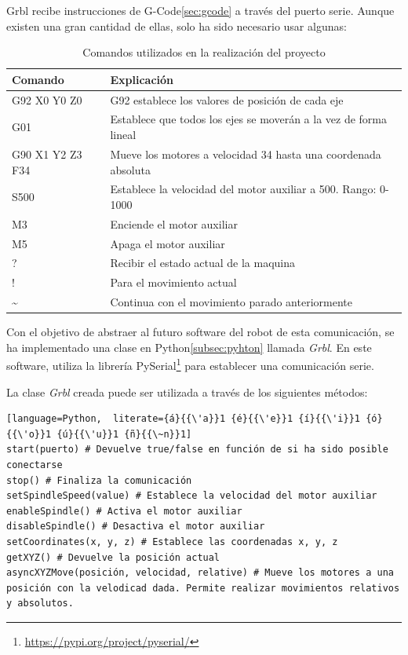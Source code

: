 \indent Grbl recibe instrucciones de G-Code\ref{sec:gcode} a través del puerto serie. Aunque existen una gran 
cantidad de ellas, solo ha sido necesario usar algunas:
\begin{table}[H]
\begin{center}
\begin{tabular}{|l|l|}
\hline
\textbf{Comando} & \textbf{Explicación} \\
\hline
G92 X0 Y0 Z0 & G92 establece los valores de posición de cada eje\\
G01 & Establece que todos los ejes se moverán a la vez de forma lineal  \\
G90 X1 Y2 Z3 F34 & Mueve los motores a velocidad 34 hasta una coordenada absoluta  \\
S500 & Establece la velocidad del motor auxiliar a 500. Rango: 0-1000  \\
M3 & Enciende el motor auxiliar  \\
M5 & Apaga el motor auxiliar  \\
? & Recibir el estado actual de la maquina  \\
! & Para el movimiento actual \\
\textasciitilde & Continua con el movimiento parado anteriormente \\
\hline
\end{tabular}
\caption{Comandos utilizados en la realización del proyecto}
\end{center}
\end{table}


Con el objetivo de abstraer al futuro software del robot de esta comunicación, se ha implementado 
una clase en Python\ref{subsec:pyhton} llamada \textit{Grbl}. En este software, utiliza la librería 
PySerial\footnote{\url{https://pypi.org/project/pyserial/}} para establecer una comunicación serie.

\noindent La clase \textit{Grbl} creada puede ser utilizada a través de los siguientes métodos:

\begin{lstlisting}[language=Python,  literate={á}{{\'a}}1 {é}{{\'e}}1 {í}{{\'i}}1 {ó}{{\'o}}1 {ú}{{\'u}}1 {ñ}{{\~n}}1]
start(puerto) # Devuelve true/false en función de si ha sido posible conectarse
stop() # Finaliza la comunicación
setSpindleSpeed(value) # Establece la velocidad del motor auxiliar
enableSpindle() # Activa el motor auxiliar
disableSpindle() # Desactiva el motor auxiliar
setCoordinates(x, y, z) # Establece las coordenadas x, y, z 
getXYZ() # Devuelve la posición actual
asyncXYZMove(posición, velocidad, relative) # Mueve los motores a una posición con la velodicad dada. Permite realizar movimientos relativos y absolutos.
\end{lstlisting}


